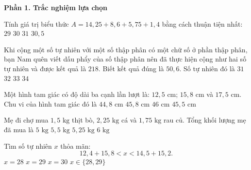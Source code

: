 \textbf{Phần 1. Trắc nghiệm lựa chọn}

\begin{ex} %
Tính giá trị biểu thức $A = 14{,}25 + 8{,}6 + 5{,}75 + 1{,}4$ bằng cách thuận tiện nhất:
\choice
{$29$}
{\True $30$}
{$31$}
{$30{,}5$}
\end{ex}

\begin{ex} %
Khi cộng một số tự nhiên với một số thập phân có một chữ số ở phần thập phân, bạn Nam quên viết dấu phẩy của số thập phân nên đã thực hiện cộng như hai số tự nhiên và được kết quả là $218$. Biết kết quả đúng là $50{,}6$. Số tự nhiên đó là
\choice
{$31$}
{\True $32$}
{$33$}
{$34$}
\end{ex}

\begin{ex} %
Một hình tam giác có độ dài ba cạnh lần lượt là: $12{,}5\text{ cm}$; $15{,}8\text{ cm}$ và $17{,}5\text{ cm}$. Chu vi của hình tam giác đó là
\choice
{$44{,}8\text{ cm}$}
{\True $45{,}8\text{ cm}$}
{$46\text{ cm}$}
{$45{,}5\text{ cm}$}
\end{ex}

\begin{ex} %
Mẹ đi chợ mua $1{,}5\text{ kg}$ thịt bò, $2{,}25\text{ kg}$ cá và $1{,}75\text{ kg}$ rau củ. Tổng khối lượng mẹ đã mua là
\choice
{$5\text{ kg}$}
{\True $5{,}5\text{ kg}$}
{$5{,}25\text{ kg}$}
{$6\text{ kg}$}
\end{ex}

\begin{ex} %
Tìm số tự nhiên $x$ thỏa mãn:
\[
12{,}4 + 15{,}8 < x < 14{,}5 + 15{,}2.
\]
\choice
{$x = 28$}
{\True $x = 29$}
{$x = 30$}
{$x \in \{28, 29\}$}
\end{ex}


